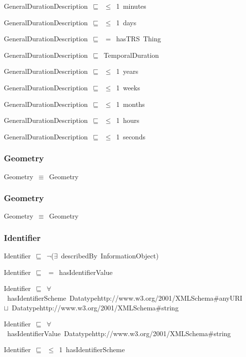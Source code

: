 \documentclass{article}
\begin{document}
GeneralDurationDescription~\ensuremath{\sqsubseteq}~\ensuremath{\leq}~1~minutes~

GeneralDurationDescription~\ensuremath{\sqsubseteq}~\ensuremath{\leq}~1~days~

GeneralDurationDescription~\ensuremath{\sqsubseteq}~\ensuremath{=}~hasTRS~Thing~

GeneralDurationDescription~\ensuremath{\sqsubseteq}~TemporalDuration~

GeneralDurationDescription~\ensuremath{\sqsubseteq}~\ensuremath{\leq}~1~years~

GeneralDurationDescription~\ensuremath{\sqsubseteq}~\ensuremath{\leq}~1~weeks~

GeneralDurationDescription~\ensuremath{\sqsubseteq}~\ensuremath{\leq}~1~months~

GeneralDurationDescription~\ensuremath{\sqsubseteq}~\ensuremath{\leq}~1~hours~

GeneralDurationDescription~\ensuremath{\sqsubseteq}~\ensuremath{\leq}~1~seconds~

\subsubsection*{Geometry}

Geometry~\ensuremath{\equiv}~Geometry

\subsubsection*{Geometry}

Geometry~\ensuremath{\equiv}~Geometry

\subsubsection*{Identifier}

Identifier~\ensuremath{\sqsubseteq}~\ensuremath{\lnot}(\ensuremath{\exists}~describedBy~InformationObject)~

Identifier~\ensuremath{\sqsubseteq}~\ensuremath{=}~hasIdentifierValue~

Identifier~\ensuremath{\sqsubseteq}~\ensuremath{\forall}~hasIdentifierScheme~Datatypehttp://www.w3.org/2001/XMLSchema#anyURI~\ensuremath{\sqcup}~Datatypehttp://www.w3.org/2001/XMLSchema#string~

Identifier~\ensuremath{\sqsubseteq}~\ensuremath{\forall}~hasIdentifierValue~Datatypehttp://www.w3.org/2001/XMLSchema#string~

Identifier~\ensuremath{\sqsubseteq}~\ensuremath{\leq}~1~hasIdentifierScheme~
\end{document}
